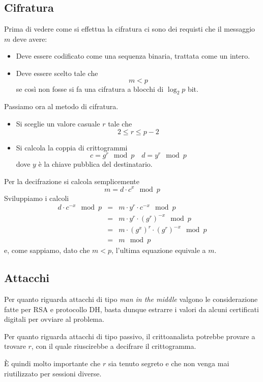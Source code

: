 \subsection{Cifratura}
Prima di vedere come si effettua la cifratura ci sono dei requisti che il messaggio $m$ deve avere:
\begin{itemize}
	\item Deve essere codificato come una sequenza binaria, trattata come un intero.
	\item Deve essere scelto tale che
	      \[ m < p \]
	      se cos\`i non fosse si fa una cifratura a blocchi di $\log_2 p$ bit.
\end{itemize}
Passiamo ora al metodo di cifratura.
\begin{itemize}
	\item Si sceglie un valore casuale $r$ tale che
	      \[ 2 \leq r \leq p - 2 \]
	\item Si calcola la coppia di crittogrammi
	      \[ c = g^r \mod{p} \quad d = y^r \mod{p} \]
	      dove $y$ \`e la chiave pubblica del destinatario.
\end{itemize}
Per la decifrazione si calcola semplicemente
\[ m = d \cdot c^x \mod{p} \]
Sviluppiamo i calcoli
\[
	\begin{matrix}
		d \cdot c^{-x} \mod{p} & = & m \cdot y^r \cdot c^{-x} \mod{p}         \\
		                       & = & m \cdot y^r \cdot (g^r)^{-x} \mod{p}     \\
		                       & = & m \cdot (g^x)^r \cdot (g^r)^{-x} \mod{p} \\
		                       & = & m \mod{p}
	\end{matrix}
\]
e, come sappiamo, dato che $m < p$, l'ultima equazione equivale a $m$.

\subsection{Attacchi}
Per quanto riguarda attacchi di tipo \emph{man in the middle} valgono le considerazione fatte per RSA e protocollo
DH, basta dunque estrarre i valori da alcuni certificati digitali per ovviare al problema.

Per quanto riguarda attacchi di tipo passivo, il crittoanalista potrebbe provare a trovare $r$, con il quale
riuscirebbe a decifrare il crittogramma.

\`E quindi molto importante che $r$ sia tenuto segreto e che non venga mai riutilizzato per sessioni diverse.

